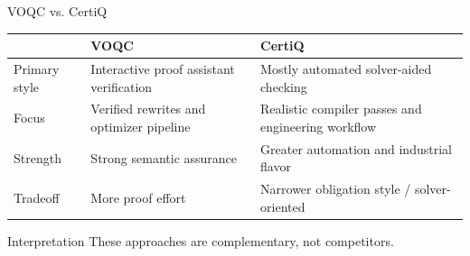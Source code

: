 \documentclass[aspectratio=169]{beamer}
\begin{document}
\begin{frame}{VOQC vs. CertiQ}
\centering
\renewcommand{\arraystretch}{1.35}
\begin{tabular}{>{\raggedright\arraybackslash}p{3.2cm} >{\raggedright\arraybackslash}p{3.8cm} >{\raggedright\arraybackslash}p{3.8cm}}
\toprule
 & \textbf{VOQC} & \textbf{CertiQ} \\
\midrule
Primary style & Interactive proof assistant verification & Mostly automated solver-aided checking \\
Focus & Verified rewrites and optimizer pipeline & Realistic compiler passes and engineering workflow \\
Strength & Strong semantic assurance & Greater automation and industrial flavor \\
Tradeoff & More proof effort & Narrower obligation style / solver-oriented \\
\bottomrule
\end{tabular}

\vspace{1em}
\begin{block}{Interpretation}
These approaches are complementary, not competitors.
\end{block}
\end{frame}
\end{document}
